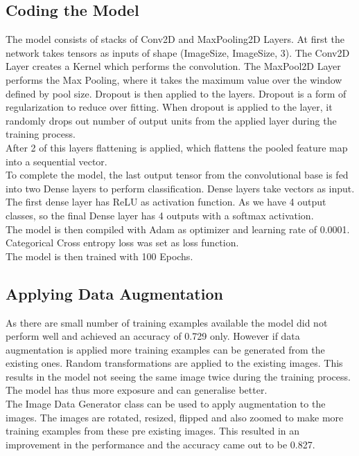 \documentclass[10pt,twocolumn,letterpaper]{article}
\begin{document}
\subsection{Coding the Model}
The model consists of stacks of Conv2D and MaxPooling2D Layers. At first the network takes tensors as inputs of shape (ImageSize, ImageSize, 3). The Conv2D Layer creates a Kernel which performs the convolution. The MaxPool2D Layer performs the Max Pooling, where it takes the maximum value over the window defined by pool size. Dropout is then applied to the layers. Dropout is a form of regularization to reduce over fitting. When dropout is applied to the layer, it randomly drops out number of output units from the applied layer during the training process. \\
After 2 of this layers flattening is applied, which flattens the pooled feature map into a sequential vector. \\
To complete the model, the last output tensor from the convolutional base is fed into two Dense layers to perform classification. Dense layers take vectors as input. The first dense layer has ReLU as activation function. As we have 4 output classes, so the final Dense layer has 4 outputs with a softmax activation. \\
The model is then compiled with Adam as optimizer and learning rate of 0.0001. Categorical Cross entropy loss was set as loss function.\\
The model is then trained with 100 Epochs. 


\subsection{Applying Data Augmentation}
As there are small number of training examples available the model did not perform well and achieved an accuracy of 0.729 only. However if data augmentation is applied more training examples can be generated from the existing ones. Random transformations are applied to the existing images. This results in the model not seeing the same image twice during the training process. The model has thus more exposure and can generalise better.\\
The Image Data Generator class can be used to apply augmentation to the images. The images are rotated, resized, flipped and also zoomed to make more training examples from these pre existing images. This resulted in an improvement in the performance and the accuracy came out to be 0.827. 
\end{document}
